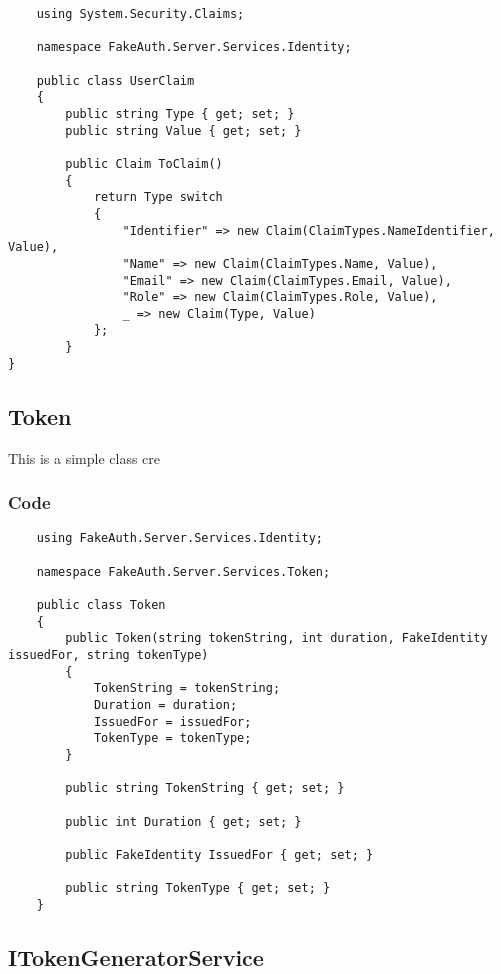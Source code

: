 \begin{verbatim}
    using System.Security.Claims;
    
    namespace FakeAuth.Server.Services.Identity;
    
    public class UserClaim
    {
        public string Type { get; set; }
        public string Value { get; set; }
        
        public Claim ToClaim()
        {
            return Type switch
            {
                "Identifier" => new Claim(ClaimTypes.NameIdentifier, Value),
                "Name" => new Claim(ClaimTypes.Name, Value),
                "Email" => new Claim(ClaimTypes.Email, Value),
                "Role" => new Claim(ClaimTypes.Role, Value),
                _ => new Claim(Type, Value)
            };
        }
}
\end{verbatim}

\subsection{Token}

This is a simple class cre

\subsubsection{Code}

\begin{verbatim}
    using FakeAuth.Server.Services.Identity;
    
    namespace FakeAuth.Server.Services.Token;
    
    public class Token
    {
        public Token(string tokenString, int duration, FakeIdentity issuedFor, string tokenType)
        {
            TokenString = tokenString;
            Duration = duration;
            IssuedFor = issuedFor;
            TokenType = tokenType;
        }
        
        public string TokenString { get; set; }
        
        public int Duration { get; set; }
        
        public FakeIdentity IssuedFor { get; set; }
        
        public string TokenType { get; set; }
    }
\end{verbatim}

\subsection{ITokenGeneratorService}


